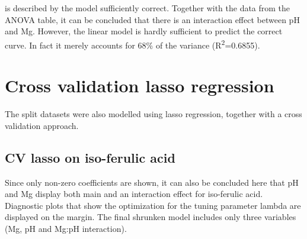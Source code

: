 \documentclass[]{tufte-handout}
\begin{document}
 is described by the model
sufficiently correct. Together with the data from the ANOVA table, it
can be concluded that there is an interaction effect between pH and Mg.
However, the linear model is hardly sufficient to predict the correct
curve. In fact it merely accounts for 68\% of the variance
(R\textsuperscript{2}=0.6855).

\section{Cross validation lasso
regression}\label{cross-validation-lasso-regression}

The split datasets were also modelled using lasso regression, together
with a cross validation approach.

\subsection{CV lasso on iso-ferulic
acid}\label{cv-lasso-on-iso-ferulic-acid}

Since only non-zero coefficients are shown, it can also be concluded
here that pH and Mg display both main and an interaction effect for
iso-ferulic acid. Diagnostic plots that show the optimization for the
tuning parameter lambda are displayed on the margin. The final shrunken
model includes only three variables (Mg, pH and Mg:pH interaction).
\end{document}
